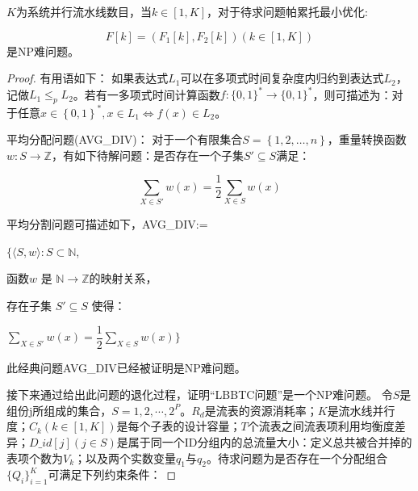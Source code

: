 \begin{theorem}%
	$K$为系统并行流水线数目，当$k\in [1,K]$，对于待求问题帕累托最小优化:
	
	\begin{equation} \label{a1}
	F\left[ k\right] =\left( F_{1}\left[ k\right] ,F_{2}\left[ k\right] \right) \left( k\in \left[ 1,K\right] \right)
	\end{equation}
	是NP难问题。
\end{theorem}



\begin{proof}
	
	有用语如下：
	如果表达式$L_1$可以在多项式时间复杂度内归约到表达式$L_2$，记做$L_1 \leq_p L_2$。若有一多项式时间计算函数$f:\{0,1\}^{\ast}\rightarrow\{0,1\}^{\ast}$，则可描述为：对于任意$x\in \left\{ 0,1\right\} ^{\ast },x\in L_{1}\Leftrightarrow f\left( x\right) \in L_{2}$。
	
	
	
	
	平均分配问题(AVG\_DIV)：
	对于一个有限集合$S=\left\{ 1,2,\ldots ,n\right\}$，重量转换函数 $w:S\rightarrow \mathbb{Z} $，有如下待解问题：是否存在一个子集$S'\subseteq S$满足：
	
	\begin{equation}
	\sum_{X\in S'}w\left( x\right) =\dfrac {1}{2}\sum _{X\in S}w\left( x\right) 
	\end{equation}
	
	平均分割问题可描述如下，AVG\_DIV:=
	
	\noindent $\{ \langle  S, w\rangle  :S\subset \mathbb{N} $,
	
	\quad 函数$w$ 是 $\mathbb{N} \rightarrow \mathbb{Z} $的映射关系，
	
	\quad 存在子集 $S'\subseteq S$ 使得： 
	
	\quad $\sum_{X\in S'}w\left( x\right) =\dfrac {1}{2}\sum _{X\in S}w\left( x\right) \}$ 
	
	此经典问题AVG\_DIV已经被证明是NP难问题。
	
	接下来通过给出此问题的退化过程，证明“LBBTC问题”是一个NP难问题。
	令$S$是组份j所组成的集合，$S={1,2,\cdots,2^P}$。$R_d$是流表的资源消耗率；$K$是流水线并行度；$C_k(k\in [1,K])$是每个子表的设计容量；$T$个流表之间流表项利用均衡度差异；$D\_id[j](j\in S)$是属于同一个ID分组内的总流量大小：定义总共被合并掉的表项个数为$V_k$；以及两个实数变量$q_1$与$q_2$。待求问题为是否存在一个分配组合$\{Q_i\}^{K}_{i=1}$可满足下列约束条件：
	

\end{proof}
